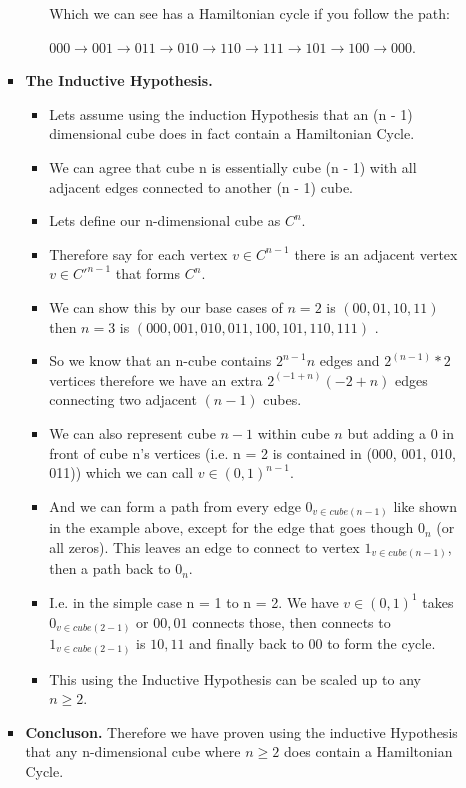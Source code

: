 \documentclass{article}
\begin{document}
\begin{enumerate}
\begin{enumerate}
\begin{itemize}
\begin{itemize}
            Which we can see has a Hamiltonian cycle if you follow the path:
            
            ${000 \rightarrow 001 \rightarrow 011 \rightarrow 010 \rightarrow 110 \rightarrow 111 \rightarrow 101 \rightarrow 100 \rightarrow 000}$.
          \end{itemize}
          \item \textbf{The Inductive Hypothesis.}
          \begin{itemize}
            \item Lets assume using the induction Hypothesis that an (n - 1) dimensional cube does in fact contain a Hamiltonian Cycle.
            \item We can agree that cube n is essentially cube (n - 1) with all adjacent edges connected to another (n - 1) cube.
            \item Lets define our n-dimensional cube as $C^n$.
            \item Therefore say for each vertex $v \in C^{n - 1}$ there is an adjacent vertex $v \in C'^{n - 1}$ that forms $C^n$.
            \item We can show this by our base cases of $n = 2$ is $(00, 01, 10, 11)$ then $n = 3$ is $(000, 001, 010, 011, 100, 101, 110, 111)$ .
            \item So we know that an n-cube contains $2^{n−1}n$ edges and $2^(n - 1) * 2$ vertices therefore we have an extra $2^{(-1 + n)} (-2 + n)$ edges connecting two adjacent $(n - 1)$ cubes. 
            \item We can also represent cube $n - 1$ within cube $n$ but adding a 0 in front of cube n's vertices (i.e. n = 2 is contained in (000, 001, 010, 011)) which we can call $v \in (0,1)^{n-1}$.
            \item And we can form a path from every edge $0_{v \in cube(n - 1)}$ like shown in the example above, except for the edge that goes though $0_n$ (or all zeros). This leaves an edge to connect to vertex $1_{v \in cube(n - 1)}$, then a path back to $0_n$.
            \item I.e. in the simple case n = 1 to n = 2. We have $v \in (0, 1)^1$ takes $0_{v \in cube(2 - 1)}$ or $00, 01$ connects those, then connects to $1_{v \in cube(2 - 1)}$ is $10, 11$ and finally back to $00$ to form the cycle.
            \item This using the Inductive Hypothesis can be scaled up to any $n \geq 2$. 
        \end{itemize}
        \item \textbf{Concluson.}        
        Therefore we have proven using the inductive Hypothesis that any n-dimensional cube where $n \ge 2$ does contain a Hamiltonian Cycle.
      \end{itemize}
    \end{enumerate}


\end{enumerate}
\end{document}
